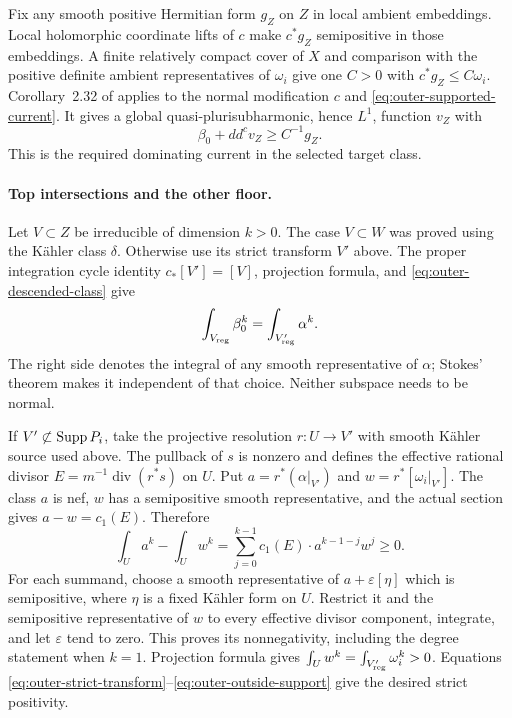Fix any smooth positive Hermitian form \(g_Z\) on \(Z\) in local
ambient embeddings.  Local holomorphic coordinate lifts of \(c\) make
\(c^*g_Z\) semipositive in those embeddings.  A finite relatively
compact cover of \(X\) and comparison with the positive definite
ambient representatives of \(\omega_i\) give one \(C>0\) with
\(c^*g_Z\leq C\omega_i\).  Corollary~2.32 of
\cite{DasHaconPaun2024} applies to the normal modification \(c\) and
\eqref{eq:outer-supported-current}.  It gives a global
quasi-plurisubharmonic, hence \(L^1\), function \(v_Z\) with
\begin{equation}\label{eq:outer-current-big}
 \beta_0+dd^c v_Z\geq C^{-1}g_Z.
\end{equation}
This is the required dominating current in the selected target class.

\paragraph{Top intersections and the other floor.}
Let \(V\subset Z\) be irreducible of dimension \(k>0\).  The case
\(V\subset W\) was proved using the K\"ahler class \(\delta\).
Otherwise use its strict transform \(V'\) above.  The proper integration
cycle identity \(c_*[V']=[V]\), projection formula, and
\eqref{eq:outer-descended-class} give
\begin{equation}\label{eq:outer-strict-transform}
 \int_{V_{\rm reg}}\beta_0^k
   =\int_{V'_{\rm reg}}\alpha^k.
\end{equation}
The right side denotes the integral of any smooth representative of
\(\alpha\); Stokes' theorem makes it independent of that choice.
Neither subspace needs to be normal.

If \(V'\not\subset\operatorname{Supp} P_i\), take the projective resolution
\(r:U\to V'\) with smooth K\"ahler source used above.  The pullback of
\(s\) is nonzero and defines
the effective rational divisor \(E=m^{-1}\operatorname{div}(r^*s)\)
on \(U\).  Put \(a=r^*(\alpha|_{V'})\) and
\(w=r^*[\omega_i|_{V'}]\).  The class \(a\) is nef, \(w\) has a
semipositive smooth representative, and the actual section gives
\(a-w=c_1(E)\).  Therefore
\begin{equation}\label{eq:outer-outside-support}
 \int_U a^k-\int_U w^k
 =\sum_{j=0}^{k-1}c_1(E)\cdot a^{k-1-j}w^j\geq0.
\end{equation}
For each summand, choose a smooth representative of
\(a+\varepsilon[\eta]\) which is semipositive, where \(\eta\) is a
fixed K\"ahler form on \(U\).  Restrict it and the semipositive
representative of \(w\) to every effective divisor component, integrate,
and let \(\varepsilon\) tend to zero.
This proves its nonnegativity, including the degree statement when
\(k=1\).  Projection formula gives
\(\int_U w^k=\int_{V'_{\rm reg}}\omega_i^k>0\).  Equations
\eqref{eq:outer-strict-transform}--\eqref{eq:outer-outside-support}
give the desired strict positivity.


